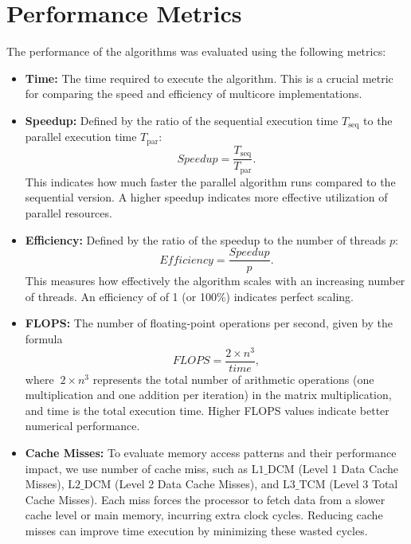 \section{Performance Metrics}  \label{section:performance}
  The performance of the algorithms was evaluated using the following metrics:

\begin{itemize}
  \item \textbf{Time:} The time required to execute the algorithm. This is a crucial metric for comparing the speed and efficiency of multicore implementations.
  
  \item \textbf{Speedup:} Defined by the ratio of the sequential execution time \( T_{\text{seq}} \) to the parallel execution time \( T_{\text{par}} \):
  \[
    Speedup = \frac{T_{\text{seq}}}{T_{\text{par}}}.
  \]
  This indicates how much faster the parallel algorithm runs compared to the sequential version. A higher speedup indicates more effective utilization of parallel resources.

  \item \textbf{Efficiency:} Defined by the ratio of the speedup to the number of threads \(p\):
  \[
    Efficiency = \frac{Speedup}{p}.
  \]
  This measures how effectively the algorithm scales with an increasing number of threads. An efficiency of of 1 (or 100\%) indicates perfect scaling.

  \item \textbf{FLOPS:} The number of floating-point operations per second, given by the formula 
  \[
    FLOPS = \frac{2 \times n^3}{time},
  \]
  where \(\ 2 \times n^3\) represents the total number of arithmetic operations (one multiplication and one addition per iteration) in the matrix multiplication, and \(\text{time}\) is the total execution time. Higher FLOPS values indicate better numerical performance.

  \item \textbf{Cache Misses:} To evaluate memory access patterns and their performance impact, we use number of cache miss, such as \(\text{L1\_DCM}\) (Level 1 Data Cache Misses), \(\text{L2\_DCM}\) (Level 2 Data Cache Misses), and \(\text{L3\_TCM}\) (Level 3 Total Cache Misses). Each miss forces the processor to fetch data from a slower cache level or main memory, incurring extra clock cycles. Reducing cache misses can improve time execution by minimizing these wasted cycles.
\end{itemize}

